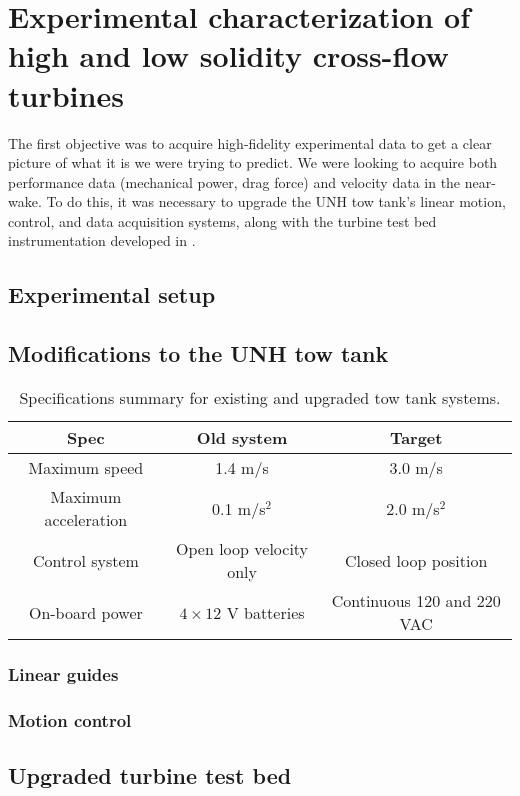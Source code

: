 \chapter{Experimental characterization of high and low solidity cross-flow turbines}

The first objective was to acquire high-fidelity experimental data to get a
clear picture of what it is we were trying to predict. We were looking to
acquire both performance data (mechanical power, drag force) and velocity data
in the near-wake. To do this, it was necessary to upgrade the UNH tow tank's
linear motion, control, and data acquisition systems, along with the turbine
test bed instrumentation developed in \cite{Bachant2011MS}.

\section{Experimental setup}


\section{Modifications to the UNH tow tank}

\begin{table}
\centering
\begin{tabular}{c|c|c}
Spec & Old system & Target \\ 
\hline
Maximum speed & 1.4 m/s  & 3.0 m/s \\ 
Maximum acceleration & 0.1 m/s$^2$ & 2.0 m/s$^2$ \\ 
Control system & Open loop velocity only & Closed loop position \\ 
On-board power & $4\times12$ V batteries & Continuous 120 and 220 VAC \\ 
\end{tabular}
\caption{Specifications summary for existing and upgraded tow tank systems.} 
\label{tab:tow-tank-specs}
\end{table}

\subsection{Linear guides}


\subsection{Motion control}


\section{Upgraded turbine test bed}


